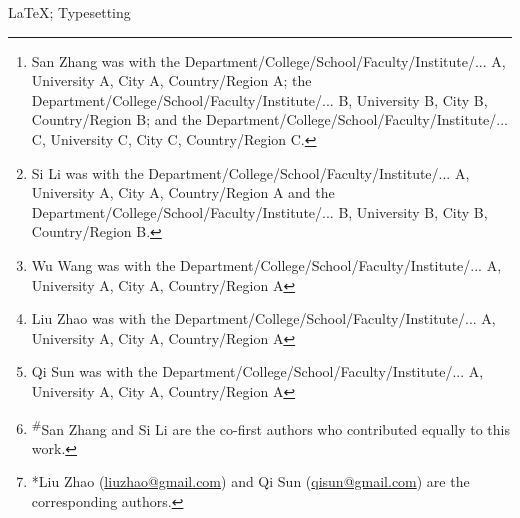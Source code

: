 \documentclass[lettersize,journal]{IEEEtran}
\begin{document}
\title{}

\author{
	San Zhang\textsuperscript{\#}\thanks{San Zhang was with the Department/College/School/Faculty/Institute/... A, University A, City A, Country/Region A; the Department/College/School/Faculty/Institute/... B, University B, City B, Country/Region B; and the Department/College/School/Faculty/Institute/... C, University C, City C, Country/Region C. }, 
	Si Li\textsuperscript{\#}\thanks{Si Li was with the Department/College/School/Faculty/Institute/... A, University A, City A, Country/Region A and the Department/College/School/Faculty/Institute/... B, University B, City B, Country/Region B. }, 
	Wu Wang\thanks{Wu Wang was with the Department/College/School/Faculty/Institute/... A, University A, City A, Country/Region A}, 
	Liu Zhao*\thanks{Liu Zhao was with the Department/College/School/Faculty/Institute/... A, University A, City A, Country/Region A}, 
	and Qi Sun*\thanks{Qi Sun was with the Department/College/School/Faculty/Institute/... A, University A, City A, Country/Region A}
	\thanks{\textsuperscript{\#}San Zhang and Si Li are the co-first authors who contributed equally to this work. }
	\thanks{*Liu Zhao (\protect\url{liuzhao@gmail.com}) and Qi Sun (\protect\url{qisun@gmail.com}) are the corresponding authors. }
}

\maketitle

\begin{abstract}
	
\end{abstract}

\begin{IEEEkeywords}
	LaTeX; Typesetting
\end{IEEEkeywords}










\end{document}
